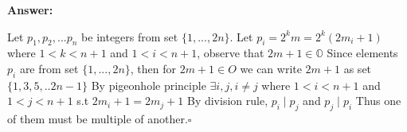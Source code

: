 \documentclass[12pt]{article}
\begin{document}
{\noindent\bf Answer:}
{
Let ${p_{1},p_{2},...p_{n}}$ be integers from set  $\{1,...,2n\}$.\newline
Let $p_{i}=2^{k}m=2^{k}(2m_{i}+1)$ where $1<k<n+1$ and $1<i<n+1$, observe that $2m+1 \in\mathbb{O}$\newline
Since elements $ p_{i}$ are from set $\{1,...,2n\}$, then for $2m+1 \in O$ we can write   $2m+1$ as set $\{1,3,5,..2n-1\}$\newline
By pigeonhole principle  $\exists i, j,i \neq j$ where $ 1<i<n+1$ and $1<j<n+1$ s.t $2m_{i}+1=2m_{j}+1$\newline
By division rule, $p_{i}\mid p_{j}$ and $p_{j}\mid p_{i}$\newline
Thus one of them must be multiple of another.$\square$


}
\end{document}

